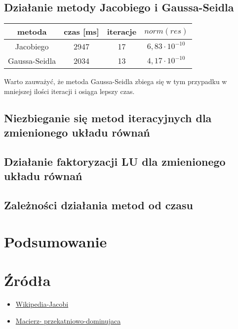 \documentclass{article}
\begin{document}
\subsection{Działanie metody Jacobiego i Gaussa-Seidla}
\begin{center}
\begin{tabular}{ c | c c c}
 metoda & czas [ms] & iteracje & $norm(res)$ \\ 
\hline
 Jacobiego & 2947 & 17 & $6,83 \cdot 10^{-10}$\\  
 Gaussa-Seidla & 2034 & 13 & $4,17 \cdot 10^{-10} $  
\end{tabular}
\end{center}
Warto zauważyć, że metoda Gaussa-Seidla zbiega się w tym przypadku w mniejszej ilości iteracji
i osiąga lepszy czas.
\subsection{Niezbieganie się metod iteracyjnych dla zmienionego układu równań}
\subsection{Działanie faktoryzacji LU dla zmienionego układu równań}
\subsection{Zależności działania metod od czasu}
\section{Podsumowanie}
\section{Źródła}
\begin{itemize}
	\item \href{https://en.wikipedia.org/wiki/Jacobi_method}{Wikipedia-Jacobi}
	\item \href{https://pl.wikipedia.org/wiki/Macierz_przek%C4%85tniowo_dominuj%C4%85ca}{Macierz-
przekatniowo-dominujaca}
\end{itemize}
\end{document}
